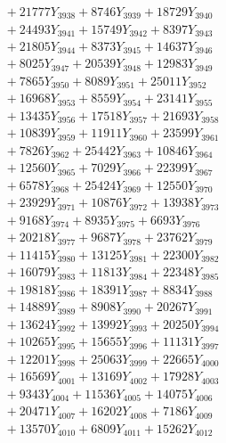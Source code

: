 \documentclass[a4paper,10pt]{article}
\begin{document}
{\begin{align}
&\;  + 21777 Y_{3938} + 8746 Y_{3939} + 18729 Y_{3940} \\[0.3ex]
&\;  + 24493 Y_{3941} + 15749 Y_{3942} + 8397 Y_{3943} \\[0.3ex]
&\;  + 21805 Y_{3944} + 8373 Y_{3945} + 14637 Y_{3946} \\[0.3ex]
&\;  + 8025 Y_{3947} + 20539 Y_{3948} + 12983 Y_{3949} \\[0.3ex]
&\;  + 7865 Y_{3950} + 8089 Y_{3951} + 25011 Y_{3952} \\[0.3ex]
&\;  + 16968 Y_{3953} + 8559 Y_{3954} + 23141 Y_{3955} \\[0.3ex]
&\;  + 13435 Y_{3956} + 17518 Y_{3957} + 21693 Y_{3958} \\[0.5ex]\allowbreak
&\;  + 10839 Y_{3959} + 11911 Y_{3960} + 23599 Y_{3961} \\[0.3ex]
&\;  + 7826 Y_{3962} + 25442 Y_{3963} + 10846 Y_{3964} \\[0.3ex]
&\;  + 12560 Y_{3965} + 7029 Y_{3966} + 22399 Y_{3967} \\[0.3ex]
&\;  + 6578 Y_{3968} + 25424 Y_{3969} + 12550 Y_{3970} \\[0.3ex]
&\;  + 23929 Y_{3971} + 10876 Y_{3972} + 13938 Y_{3973} \\[0.3ex]
&\;  + 9168 Y_{3974} + 8935 Y_{3975} + 6693 Y_{3976} \\[0.3ex]
&\;  + 20218 Y_{3977} + 9687 Y_{3978} + 23762 Y_{3979} \\[0.3ex]
&\;  + 11415 Y_{3980} + 13125 Y_{3981} + 22300 Y_{3982} \\[0.3ex]
&\;  + 16079 Y_{3983} + 11813 Y_{3984} + 22348 Y_{3985} \\[0.3ex]
&\;  + 19818 Y_{3986} + 18391 Y_{3987} + 8834 Y_{3988} \\[0.5ex]\allowbreak
&\;  + 14889 Y_{3989} + 8908 Y_{3990} + 20267 Y_{3991} \\[0.3ex]
&\;  + 13624 Y_{3992} + 13992 Y_{3993} + 20250 Y_{3994} \\[0.3ex]
&\;  + 10265 Y_{3995} + 15655 Y_{3996} + 11131 Y_{3997} \\[0.3ex]
&\;  + 12201 Y_{3998} + 25063 Y_{3999} + 22665 Y_{4000} \\[0.3ex]
&\;  + 16569 Y_{4001} + 13169 Y_{4002} + 17928 Y_{4003} \\[0.3ex]
&\;  + 9343 Y_{4004} + 11536 Y_{4005} + 14075 Y_{4006} \\[0.3ex]
&\;  + 20471 Y_{4007} + 16202 Y_{4008} + 7186 Y_{4009} \\[0.3ex]
&\;  + 13570 Y_{4010} + 6809 Y_{4011} + 15262 Y_{4012} \\[0.3ex]

\end{align}}
\end{document}
